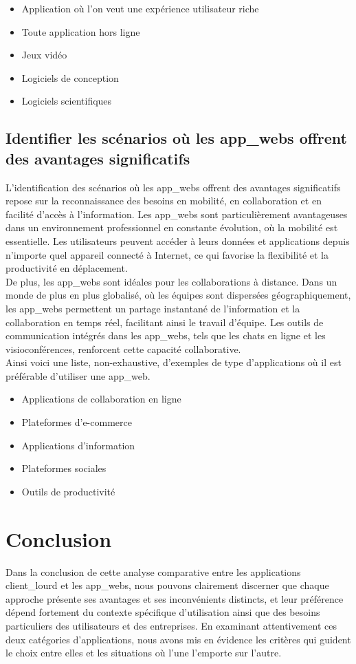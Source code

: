 \documentclass[a4paper, 12pt, french]{article}
\newcommand{\bdot}{\item[\color{ssiYellow}\ding{108}]}
\begin{document}
				\begin{itemize}
					\bdot{Application où l'on veut une expérience utilisateur riche}
					\bdot{Toute application hors ligne}
					\bdot{Jeux vidéo}
					\bdot{Logiciels de conception}
					\bdot{Logiciels scientifiques}
				\end{itemize}

			\subsection{Identifier les scénarios où les \glspl{app_web} offrent des avantages significatifs}
				L'identification des scénarios où les \glspl{app_web} offrent des avantages significatifs repose sur la reconnaissance des besoins en mobilité, en collaboration et en facilité d'accès à l'information. Les \glspl{app_web} sont particulièrement avantageuses dans un environnement professionnel en constante évolution, où la mobilité est essentielle. Les utilisateurs peuvent accéder à leurs données et applications depuis n'importe quel appareil connecté à Internet, ce qui favorise la flexibilité et la productivité en déplacement.\\

				De plus, les \glspl{app_web} sont idéales pour les collaborations à distance. Dans un monde de plus en plus globalisé, où les équipes sont dispersées géographiquement, les \glspl{app_web} permettent un partage instantané de l'information et la collaboration en temps réel, facilitant ainsi le travail d'équipe. Les outils de communication intégrés dans les \glspl{app_web}, tels que les chats en ligne et les visioconférences, renforcent cette capacité collaborative.\\
	
				Ainsi voici une liste, non-exhaustive, d'exemples de type d'applications où il est préférable d'utiliser une \gls{app_web}.

				\begin{itemize}
					\bdot{Applications de collaboration en ligne}
					\bdot{Plateformes d'e-commerce}
					\bdot{Applications d'information}
					\bdot{Plateformes sociales}
					\bdot{Outils de productivité}
				\end{itemize}
				
		\section{Conclusion}
			Dans la conclusion de cette analyse comparative entre les applications \gls{client_lourd} et les \glspl{app_web}, nous pouvons clairement discerner que chaque approche présente ses avantages et ses inconvénients distincts, et leur préférence dépend fortement du contexte spécifique d'utilisation ainsi que des besoins particuliers des utilisateurs et des entreprises. En examinant attentivement ces deux catégories d'applications, nous avons mis en évidence les critères qui guident le choix entre elles et les situations où l'une l'emporte sur l'autre.\\
\end{document}
